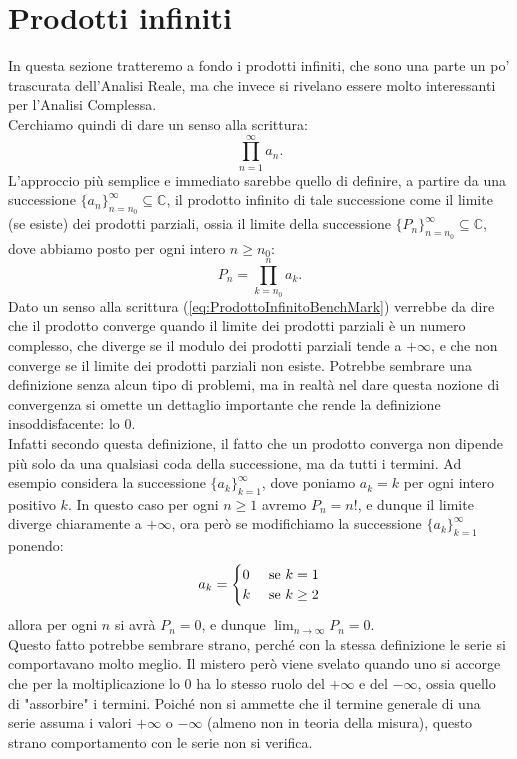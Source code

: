 \documentclass[11pt]{book}
\theoremstyle{Definizione}
\theoremstyle{TeoremaProposizioneLemmaCorollarioCongettura}
\theoremstyle{OsservazioneNotaEsempio}
\newcommand{\C}{\mathbb{C}}
\begin{document}
 \section{Prodotti infiniti}
In questa sezione tratteremo a fondo i prodotti infiniti, che sono una parte un po' trascurata dell'Analisi Reale, ma che invece si rivelano essere molto interessanti per l'Analisi Complessa.\\
Cerchiamo quindi di dare un senso alla scrittura:
\begin{equation}\label{eq:ProdottoInfinitoBenchMark}
\prod_{n = 1}^\infty a_n.
\end{equation}
L'approccio più semplice e immediato sarebbe quello di definire, a partire da una successione $\{a_n\}_{n = n_0}^\infty\subseteq \C$, il prodotto infinito di tale successione come il limite (se esiste) dei prodotti parziali, ossia il limite della successione $\{P_n\}_{n = n_0}^\infty\subseteq \C$, dove abbiamo posto per ogni intero $n\geq n_0$:
$$
P_n = \prod_{k = n_0}^n a_k.
$$
Dato un senso alla scrittura (\ref{eq:ProdottoInfinitoBenchMark}) verrebbe da dire che il prodotto converge quando il limite dei prodotti parziali è un numero complesso, che diverge se il modulo dei prodotti parziali tende a $+\infty$, e che non converge se il limite dei prodotti parziali non esiste. Potrebbe sembrare una definizione senza alcun tipo di problemi, ma in realtà nel dare questa nozione di convergenza si omette un dettaglio importante che rende la definizione insoddisfacente: lo $0$.\\
Infatti secondo questa definizione, il fatto che un prodotto converga non dipende più solo da una qualsiasi coda della successione, ma da tutti i termini. Ad esempio considera la successione $\{a_k\}_{k = 1}^\infty$, dove poniamo $a_k = k$ per ogni intero positivo $k$. In questo caso per ogni $n\geq 1$ avremo $P_n = n!$, e dunque il limite diverge chiaramente a $+\infty$, ora però se modifichiamo la successione $\{a_k\}_{k = 1}^\infty$ ponendo:
$$
a_k = \begin{cases}
0 &\textup{ se }k = 1\\
k &\textup{ se }k \geq 2
\end{cases}
$$
allora per ogni $n$ si avrà $P_n = 0$, e dunque $\lim_{n\to\infty} P_n = 0$.\\
Questo fatto potrebbe sembrare strano, perché con la stessa definizione le serie si comportavano molto meglio. Il mistero però viene svelato quando uno si accorge che per la moltiplicazione lo $0$ ha lo stesso ruolo del $+\infty$ e del $-\infty$, ossia quello di "assorbire" i termini. Poiché non si ammette che il termine generale di una serie assuma i valori $+\infty$ o $-\infty$ (almeno non in teoria della misura), questo strano comportamento con le serie non si verifica.\\
\end{document}
